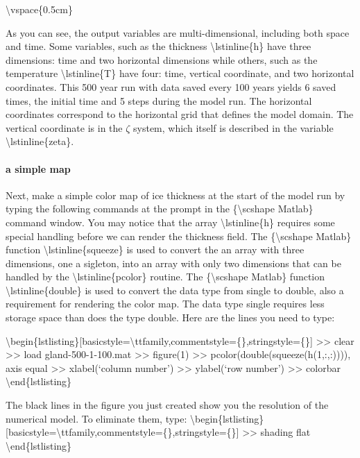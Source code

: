 \textbackslash{}vspace\{0.5cm\}

As you can see, the output variables are multi-dimensional, including
both space and time. Some variables, such as the thickness
\textbackslash{}lstinline\{h\} have three dimensions: time and two
horizontal dimensions while others, such as the temperature
\textbackslash{}lstinline\{T\} have four: time, vertical coordinate, and
two horizontal coordinates. This 500 year run with data saved every 100
years yields 6 saved times, the initial time and 5 steps during the
model run. The horizontal coordinates correspond to the horizontal grid
that defines the model domain. The vertical coordinate is in the $\zeta$
system, which itself is described in the variable
\textbackslash{}lstinline\{zeta\}.

\paragraph{a simple map}

Next, make a simple color map of ice thickness at the start of the model
run by typing the following commands at the prompt in the
\{\textbackslash{}scshape Matlab\} command window. You may notice that
the array \textbackslash{}lstinline\{h\} requires some special handling
before we can render the thickness field. The \{\textbackslash{}scshape
Matlab\} function \textbackslash{}lstinline\{squeeze\} is used to
convert the an array with three dimensions, one a sigleton, into an
array with only two dimensions that can be handled by the
\textbackslash{}lstinline\{pcolor\} routine. The
\{\textbackslash{}scshape Matlab\} function
\textbackslash{}lstinline\{double\} is used to convert the data type
from single to double, also a requirement for rendering the color map.
The data type single requires less storage space than does the type
double. Here are the lines you need to type:

\textbackslash{}begin\{lstlisting\}{[}basicstyle=\textbackslash{}ttfamily,commentstyle=\{\},stringstyle=\{\}{]}
\textgreater{}\textgreater{} clear \textgreater{}\textgreater{} load
gland-500-1-100.mat \textgreater{}\textgreater{} figure(1)
\textgreater{}\textgreater{} pcolor(double(squeeze(h(1,:,:)))), axis
equal \textgreater{}\textgreater{} xlabel(`column number')
\textgreater{}\textgreater{} ylabel(`row number')
\textgreater{}\textgreater{} colorbar \textbackslash{}end\{lstlisting\}

The black lines in the figure you just created show you the resolution
of the numerical model. To eliminate them, type:
\textbackslash{}begin\{lstlisting\}{[}basicstyle=\textbackslash{}ttfamily,commentstyle=\{\},stringstyle=\{\}{]}
\textgreater{}\textgreater{} shading flat
\textbackslash{}end\{lstlisting\}

